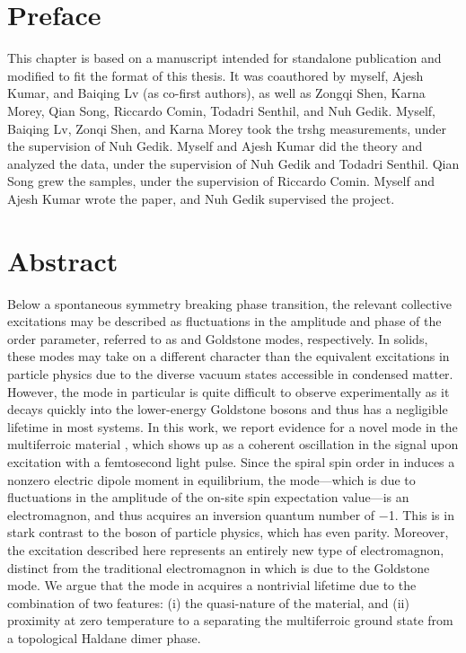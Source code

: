 \section{Preface}

This chapter is based on a manuscript intended for standalone publication and modified to fit the format of this thesis.
It was coauthored by myself, Ajesh Kumar, and Baiqing Lv (as co-first authors), as well as Zongqi Shen, Karna Morey, Qian Song, Riccardo Comin, Todadri Senthil, and Nuh Gedik.
Myself, Baiqing Lv, Zonqi Shen, and Karna Morey took the \gls{trshg} measurements, under the supervision of Nuh Gedik.
Myself and Ajesh Kumar did the theory and analyzed the data, under the supervision of Nuh Gedik and Todadri Senthil.
Qian Song grew the samples, under the supervision of Riccardo Comin.
Myself and Ajesh Kumar wrote the paper, and Nuh Gedik supervised the project.

\section{Abstract}
Below a spontaneous symmetry breaking phase transition, the relevant collective excitations may be described as fluctuations in the amplitude and phase of the order parameter, referred to as \higgs and Goldstone modes, respectively.
In solids, these modes may take on a different character than the equivalent excitations in particle physics due to the diverse vacuum states accessible in condensed matter.
However, the \higgs mode in particular is quite difficult to observe experimentally as it decays quickly into the lower-energy Goldstone bosons and thus has a negligible lifetime in most systems.
In this work, we report evidence for a novel \higgs mode in the multiferroic material , which shows up as a coherent oscillation in the  signal upon excitation with a femtosecond light pulse.
Since the spiral spin order in  induces a nonzero electric dipole moment in equilibrium, the \higgs mode---which is due to fluctuations in the amplitude of the on-site spin expectation value---is an electromagnon, and thus acquires an inversion quantum number of \num{-1}. 
This is in stark contrast to the \higgs boson of particle physics, which has even parity.
Moreover, the excitation described here represents an entirely new type of electromagnon, distinct from the traditional electromagnon in  which is due to the Goldstone mode.
We argue that the \higgs mode in  acquires a nontrivial lifetime due to the combination of two features: (i) the quasi-\oned nature of the material, and (ii) proximity at zero temperature to a  separating the multiferroic ground state from a topological Haldane dimer phase.

